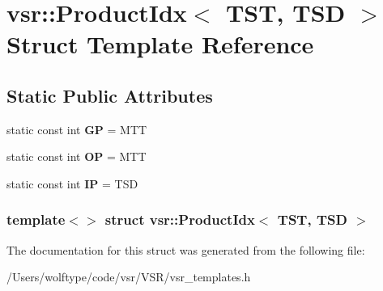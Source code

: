 \hypertarget{structvsr_1_1_product_idx_3_01_t_s_t_00_01_t_s_d_01_4}{\section{vsr\-:\-:Product\-Idx$<$ T\-S\-T, T\-S\-D $>$ Struct Template Reference}
\label{structvsr_1_1_product_idx_3_01_t_s_t_00_01_t_s_d_01_4}
}
\subsection*{Static Public Attributes}
\begin{DoxyCompactItemize}
\item 
\hypertarget{structvsr_1_1_product_idx_3_01_t_s_t_00_01_t_s_d_01_4_aa663fe0680c77d3a52a665e51598a6e0}{static const int {\bfseries G\-P} = M\-T\-T}\label{structvsr_1_1_product_idx_3_01_t_s_t_00_01_t_s_d_01_4_aa663fe0680c77d3a52a665e51598a6e0}

\item 
\hypertarget{structvsr_1_1_product_idx_3_01_t_s_t_00_01_t_s_d_01_4_aba76d52af1807988c2ae45d5e4944a11}{static const int {\bfseries O\-P} = M\-T\-T}\label{structvsr_1_1_product_idx_3_01_t_s_t_00_01_t_s_d_01_4_aba76d52af1807988c2ae45d5e4944a11}

\item 
\hypertarget{structvsr_1_1_product_idx_3_01_t_s_t_00_01_t_s_d_01_4_abfebe1b8806a03e95903a6829f7fd8c2}{static const int {\bfseries I\-P} = T\-S\-D}\label{structvsr_1_1_product_idx_3_01_t_s_t_00_01_t_s_d_01_4_abfebe1b8806a03e95903a6829f7fd8c2}

\end{DoxyCompactItemize}
\subsubsection*{template$<$$>$ struct vsr\-::\-Product\-Idx$<$ T\-S\-T, T\-S\-D $>$}



The documentation for this struct was generated from the following file\-:\begin{DoxyCompactItemize}
\item 
/\-Users/wolftype/code/vsr/\-V\-S\-R/vsr\-\_\-templates.\-h\end{DoxyCompactItemize}

